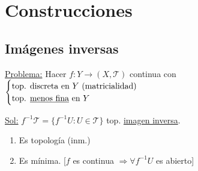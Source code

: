 \documentclass[10pt,a4paper,openright]{book}
\theoremstyle{break}
\begin{document}
\chapter{Construcciones}%
\label{cha:construcciones}
\section{Imágenes inversas}%
\label{sec:imagenes_inversas}
\underline{Problema:} Hacer $f: Y \rightarrow \left( X, \mathcal{T} \right)$ continua con $\begin{cases}
    \text{top. discreta en } Y \text{ (matricialidad)}\\
    \text{top. \underline{menos fina} en } Y 
\end{cases}$ 

\underline{Sol:} $f^{-1} \mathcal{T} = \{f^{-1}U: U \in \mathcal{T}\}$ top. \underline{imagen inversa}. 
\begin{enumerate}
    \item Es topología (inm.)
    \item Es mínima. [$f$ es continua $\Rightarrow \forall f^{-1}U$ es abierto]
\end{enumerate}
\end{document}
